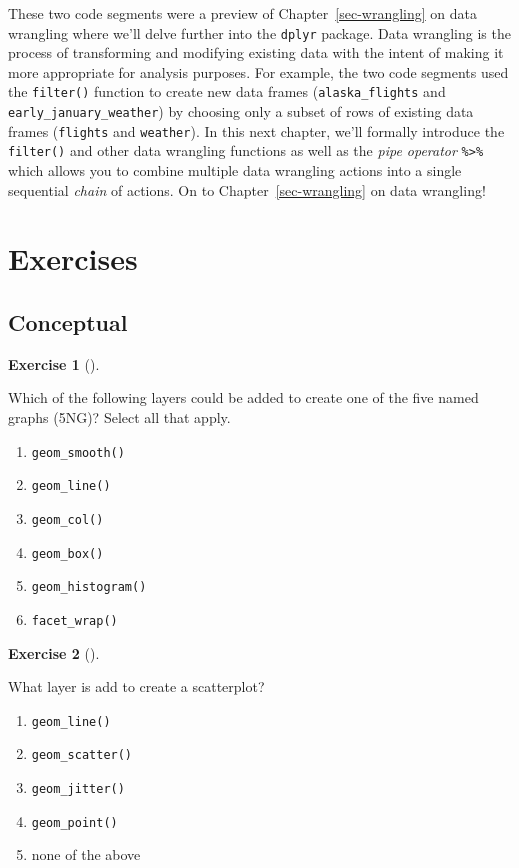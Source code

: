 \documentclass[
  letterpaper,
  DIV=11,
  numbers=noendperiod]{scrreprt}
\providecommand{\tightlist}{%
  \setlength{\itemsep}{0pt}\setlength{\parskip}{0pt}}\usepackage{longtable,booktabs,array}
\theoremstyle{definition}
\newtheorem{exercise}{Exercise}[chapter]
\theoremstyle{remark}
\begin{document}
These two code segments were a preview of Chapter~\ref{sec-wrangling} on
data wrangling where we'll delve further into the \texttt{dplyr}
package. Data wrangling is the process of transforming and modifying
existing data with the intent of making it more appropriate for analysis
purposes. For example, the two code segments used the \texttt{filter()}
function to create new data frames (\texttt{alaska\_flights} and
\texttt{early\_january\_weather}) by choosing only a subset of rows of
existing data frames (\texttt{flights} and \texttt{weather}). In this
next chapter, we'll formally introduce the \texttt{filter()} and other
data wrangling functions as well as the \emph{pipe operator}
\texttt{\%\textgreater{}\%} which allows you to combine multiple data
wrangling actions into a single sequential \emph{chain} of actions. On
to Chapter~\ref{sec-wrangling} on data wrangling!

\hypertarget{sec-ex02}{%
\section{Exercises}\label{sec-ex02}}

\hypertarget{sec-ex02-conceptual}{%
\subsection{Conceptual}\label{sec-ex02-conceptual}}

\begin{exercise}[]\protect\hypertarget{exr-ch02-c01}{}\label{exr-ch02-c01}

Which of the following layers could be added to create one of the five
named graphs (5NG)? Select all that apply.

\begin{enumerate}
\def\labelenumi{\alph{enumi})}
\tightlist
\item
  \texttt{geom\_smooth()}
\item
  \texttt{geom\_line()}
\item
  \texttt{geom\_col()}
\item
  \texttt{geom\_box()}
\item
  \texttt{geom\_histogram()}
\item
  \texttt{facet\_wrap()}
\end{enumerate}

\end{exercise}

\begin{exercise}[]\protect\hypertarget{exr-ch02-c02}{}\label{exr-ch02-c02}

What layer is add to create a scatterplot?

\begin{enumerate}
\def\labelenumi{\alph{enumi})}
\tightlist
\item
  \texttt{geom\_line()}
\item
  \texttt{geom\_scatter()}
\item
  \texttt{geom\_jitter()}
\item
  \texttt{geom\_point()}
\item
  none of the above
\end{enumerate}

\end{exercise}
\end{document}
